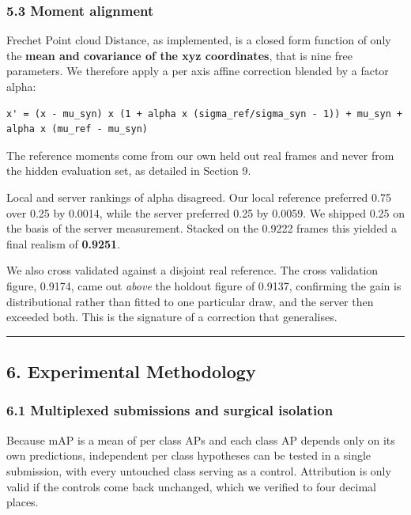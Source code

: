 \documentclass[
  10pt,
]{article}
\begin{document}
\subsubsection{5.3 Moment alignment}\label{moment-alignment}

Frechet Point cloud Distance, as implemented, is a closed form function
of only the \textbf{mean and covariance of the xyz coordinates}, that is
nine free parameters. We therefore apply a per axis affine correction
blended by a factor alpha:

\begin{verbatim}
x' = (x - mu_syn) x (1 + alpha x (sigma_ref/sigma_syn - 1)) + mu_syn + alpha x (mu_ref - mu_syn)
\end{verbatim}

The reference moments come from our own held out real frames and never
from the hidden evaluation set, as detailed in Section 9.

Local and server rankings of alpha disagreed. Our local reference
preferred 0.75 over 0.25 by 0.0014, while the server preferred 0.25 by
0.0059. We shipped 0.25 on the basis of the server measurement. Stacked
on the 0.9222 frames this yielded a final realism of \textbf{0.9251}.

We also cross validated against a disjoint real reference. The cross
validation figure, 0.9174, came out \emph{above} the holdout figure of
0.9137, confirming the gain is distributional rather than fitted to one
particular draw, and the server then exceeded both. This is the
signature of a correction that generalises.

\begin{center}\rule{0.5\linewidth}{0.5pt}\end{center}

\subsection{6. Experimental Methodology}\label{experimental-methodology}

\subsubsection{6.1 Multiplexed submissions and surgical
isolation}\label{multiplexed-submissions-and-surgical-isolation}

Because mAP is a mean of per class APs and each class AP depends only on
its own predictions, independent per class hypotheses can be tested in a
single submission, with every untouched class serving as a control.
Attribution is only valid if the controls come back unchanged, which we
verified to four decimal places.
\end{document}
